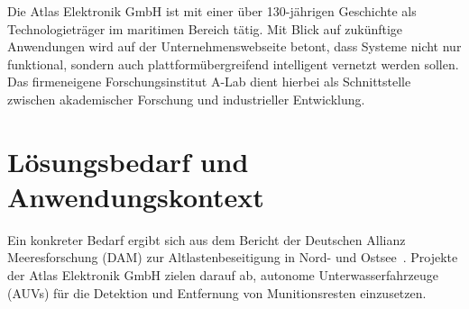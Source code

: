 Die Atlas Elektronik GmbH ist mit einer über 130-jährigen Geschichte als Technologieträger im maritimen Bereich tätig. Mit Blick auf zukünftige Anwendungen wird auf der Unternehmenswebseite betont, dass Systeme nicht nur funktional, sondern auch plattformübergreifend intelligent vernetzt werden sollen. Das firmeneigene Forschungsinstitut A-Lab dient hierbei als Schnittstelle zwischen akademischer Forschung und industrieller Entwicklung.

\section{Lösungsbedarf und Anwendungskontext}

Ein konkreter Bedarf ergibt sich aus dem Bericht der Deutschen Allianz Meeresforschung (DAM) zur Altlastenbeseitigung in Nord- und Ostsee~\parencite{dam2024}. Projekte der Atlas Elektronik GmbH zielen darauf ab, autonome Unterwasserfahrzeuge (AUVs) für die Detektion und Entfernung von Munitionsresten einzusetzen. 





